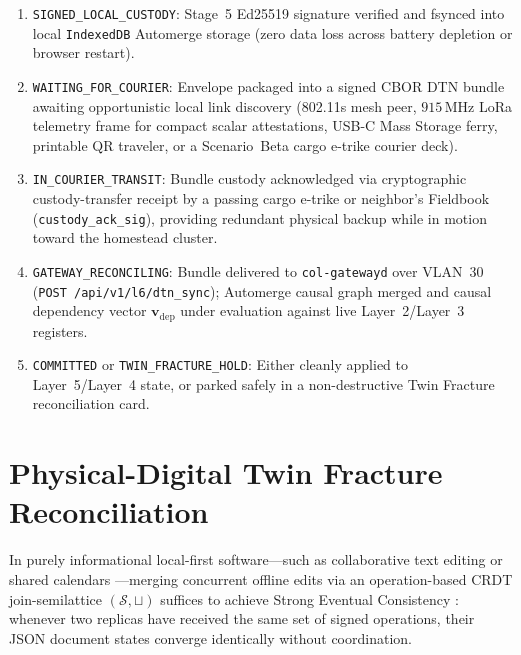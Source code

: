 \begin{enumerate}
  \item \texttt{SIGNED\_LOCAL\_CUSTODY}: Stage~5 Ed25519 signature verified and fsynced into local \texttt{IndexedDB} Automerge storage (zero data loss across battery depletion or browser restart).
  \item \texttt{WAITING\_FOR\_COURIER}: Envelope packaged into a signed CBOR DTN bundle awaiting opportunistic local link discovery (802.11s mesh peer, $915\,\mathrm{MHz}$ LoRa telemetry frame for compact scalar attestations, USB-C Mass Storage ferry, printable QR traveler, or a Scenario~Beta cargo e-trike courier deck).
  \item \texttt{IN\_COURIER\_TRANSIT}: Bundle custody acknowledged via cryptographic custody-transfer receipt by a passing cargo e-trike or neighbor's Fieldbook (\texttt{custody\_ack\_sig}), providing redundant physical backup while in motion toward the homestead cluster.
  \item \texttt{GATEWAY\_RECONCILING}: Bundle delivered to \texttt{col-gatewayd} over VLAN~30 (\texttt{POST /api/v1/l6/dtn\_sync}); Automerge causal graph merged and causal dependency vector $\mathbf{v}_{\mathrm{dep}}$ under evaluation against live Layer~2/Layer~3 registers.
  \item \texttt{COMMITTED} or \texttt{TWIN\_FRACTURE\_HOLD}: Either cleanly applied to Layer~5/Layer~4 state, or parked safely in a non-destructive Twin Fracture reconciliation card.
\end{enumerate}

\section{Physical-Digital Twin Fracture Reconciliation}
\label{sec:twin-fracture}

In purely informational local-first software---such as collaborative text editing or shared calendars \parencite{kleppmann2019localfirst,kleppmann2017automerge}---merging concurrent offline edits via an operation-based CRDT join-semilattice $(\mathcal{S}, \sqcup)$ suffices to achieve Strong Eventual Consistency \parencite{shapiro2011crdt}: whenever two replicas have received the same set of signed operations, their JSON document states converge identically without coordination.

